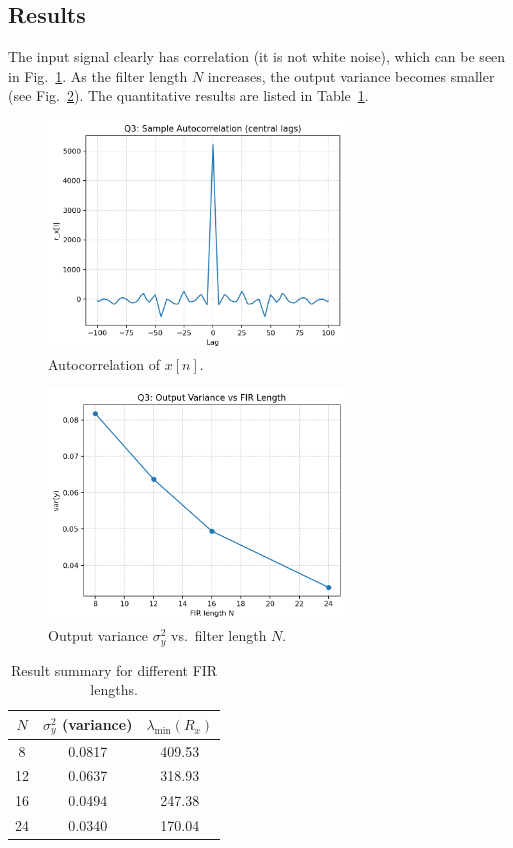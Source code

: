 \documentclass[12pt,a4paper]{article}
\begin{document}
\subsection{Results}
The input signal clearly has correlation (it is not white noise), which can be seen in Fig.~\ref{fig:q3_autocorr}.  
As the filter length $N$ increases, the output variance becomes smaller (see Fig.~\ref{fig:q3_var_vs_N}).  
The quantitative results are listed in Table~\ref{tab:q3_results}.

\begin{figure}[H]
    \centering
    \includegraphics[width=0.7\textwidth]{outputs/q3/q3_autocorr.png}
    \caption{Autocorrelation of $x[n]$.}
    \label{fig:q3_autocorr}
\end{figure}

\begin{figure}[H]
    \centering
    \includegraphics[width=0.7\textwidth]{outputs/q3/q3_var_vs_N.png}
    \caption{Output variance $\sigma_y^2$ vs.\ filter length $N$.}
    \label{fig:q3_var_vs_N}
\end{figure}

\begin{table}[H]
\centering
\caption{Result summary for different FIR lengths.}
\label{tab:q3_results}
\begin{tabular}{@{}ccc@{}}
\toprule
$N$ & $\sigma_y^2$ (variance) & $\lambda_{\min}(R_x)$ \\
\midrule
8  & 0.0817 & 409.53 \\
12 & 0.0637 & 318.93 \\
16 & 0.0494 & 247.38 \\
24 & 0.0340 & 170.04 \\
\bottomrule
\end{tabular}
\end{table}
\end{document}
